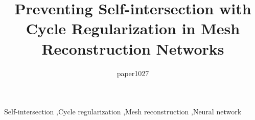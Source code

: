 \documentclass[final,3p]{elsarticle}
\begin{document}
\begin{frontmatter}
\title{Preventing Self-intersection with Cycle Regularization in Mesh Reconstruction Networks}

\author{paper1027}




\begin{keyword}
Self-intersection \sep Cycle regularization \sep Mesh reconstruction \sep Neural network
\end{keyword}

\end{frontmatter}

\linenumbers








\end{document}
